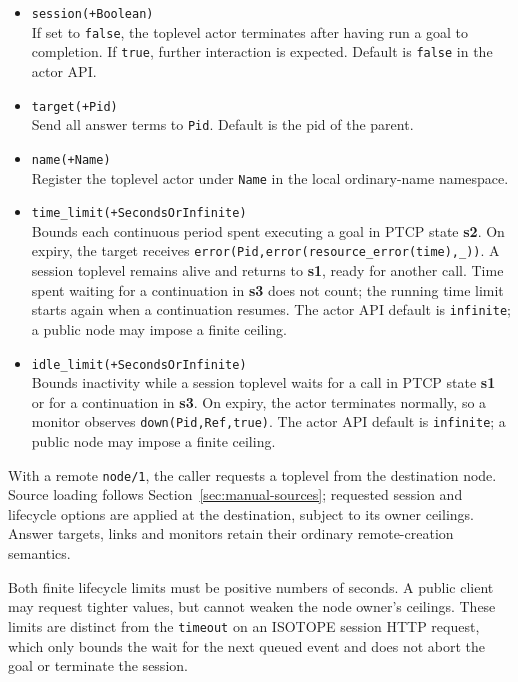 \begin{itemize}
\item
  \texttt{session(\allowbreak{}+Boolean)}\\
  If set to \texttt{false}, the toplevel actor terminates after having run a
  goal to completion. If \texttt{true}, further interaction is expected.
  Default is \texttt{false} in the actor API.
\item
  \texttt{target(\allowbreak{}+Pid)}\\
  Send all answer terms to \texttt{Pid}. Default is the pid of the parent.
\item
  \texttt{name(\allowbreak{}+Name)}\\
  Register the toplevel actor under \texttt{Name} in the local ordinary-name
  namespace.
\item
  \texttt{time\_\allowbreak{}limit(\allowbreak{}+SecondsOrInfinite)}\\
  Bounds each continuous period spent executing a goal in PTCP state
  \textbf{s2}. On expiry, the target receives
  \texttt{error(\allowbreak{}Pid,\allowbreak{}error(\allowbreak{}resource\_\allowbreak{}error(\allowbreak{}time),\allowbreak{}\_\allowbreak{}))}. A session toplevel remains alive
  and returns to \textbf{s1}, ready for another call. Time spent waiting for a
  continuation in \textbf{s3} does not count; the running time limit starts
  again when a continuation resumes. The actor API default is
  \texttt{infinite}; a public node may impose a finite ceiling.
\item
  \texttt{idle\_\allowbreak{}limit(\allowbreak{}+SecondsOrInfinite)}\\
  Bounds inactivity while a session toplevel waits for a call in PTCP state
  \textbf{s1} or for a continuation in \textbf{s3}. On expiry, the actor
  terminates normally, so a monitor observes
  \texttt{down(\allowbreak{}Pid,\allowbreak{}Ref,\allowbreak{}true)}. The actor API default is \texttt{infinite}; a
  public node may impose a finite ceiling.
\end{itemize}

\noindent With a remote \texttt{node/1}, the caller requests a toplevel from
the destination node. Source loading follows Section~\ref{sec:manual-sources}; requested session and lifecycle options are applied at
the destination, subject to its owner ceilings. Answer targets, links and
monitors retain their ordinary remote-creation semantics.

\noindent Both finite lifecycle limits must be positive numbers of seconds.
A public client may request tighter values, but cannot weaken the node
owner's ceilings. These limits are distinct from the \texttt{timeout} on an
ISOTOPE session HTTP request, which only bounds the wait for the next queued
event and does not abort the goal or terminate the session.

